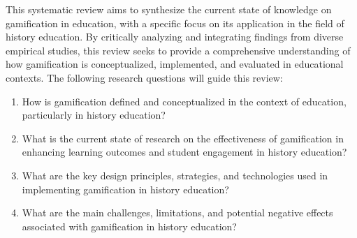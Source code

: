 \documentclass[a4paper,fleqn]{cas-sc}
\begin{document}
This systematic review aims to synthesize the current state of knowledge on gamification in education, with a specific focus on its application in the field of history education. 
By critically analyzing and integrating findings from diverse empirical studies, this review seeks to provide a comprehensive understanding of how gamification is conceptualized, implemented, and evaluated in educational contexts. The following research questions will guide this review:
\begin{enumerate}[label=RQ\arabic*:,leftmargin=*,noitemsep]
\item How is gamification defined and conceptualized in the context of education, particularly in history education?
\item What is the current state of research on the effectiveness of gamification in enhancing learning outcomes and student engagement in history education?
\item What are the key design principles, strategies, and technologies used in implementing gamification in history education?
\item What are the main challenges, limitations, and potential negative effects associated with gamification in history education?
\end{enumerate}
\end{document}
